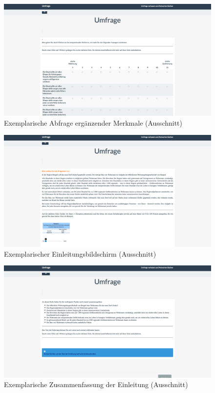 \documentclass[a4paper]{thesis}
\begin{document}
\begin{figure}[H]
\centering
\includegraphics[width=1\textwidth]{figures/lime_2.png}
\caption[Exemplarische Abfrage ergänzender Merkmale (Ausschnitt)]{Exemplarische Abfrage ergänzender Merkmale (Ausschnitt)}
\end{figure}

\begin{figure}[H]
\centering
\includegraphics[width=1\textwidth]{figures/lime_3.png}
\caption[Exemplarischer Einleitungsbildschirm (Ausschnitt)]{Exemplarischer Einleitungsbildschirm (Ausschnitt)}
\end{figure}

\begin{figure}[H]
\centering
\includegraphics[width=1\textwidth]{figures/lime_4.png}
\caption[Exemplarische Zusammenfassung einer Einleitung (Ausschnitt)]{Exemplarische Zusammenfassung der Einleitung (Ausschnitt)}
\end{figure}
\end{document}
